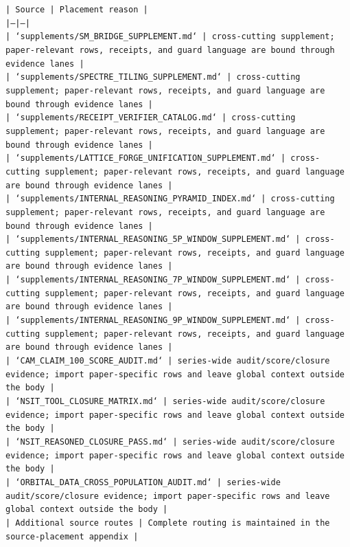\documentclass[11pt]{article}
\begin{document}
\noindent\texttt{| Source | Placement reason |}\\
\noindent\texttt{|---|---|}\\
\noindent\texttt{| `supplements/SM\_BRIDGE\_SUPPLEMENT.md` | cross-cutting supplement; paper-relevant rows, receipts, and guard language are bound through evidence lanes |}\\
\noindent\texttt{| `supplements/SPECTRE\_TILING\_SUPPLEMENT.md` | cross-cutting supplement; paper-relevant rows, receipts, and guard language are bound through evidence lanes |}\\
\noindent\texttt{| `supplements/RECEIPT\_VERIFIER\_CATALOG.md` | cross-cutting supplement; paper-relevant rows, receipts, and guard language are bound through evidence lanes |}\\
\noindent\texttt{| `supplements/LATTICE\_FORGE\_UNIFICATION\_SUPPLEMENT.md` | cross-cutting supplement; paper-relevant rows, receipts, and guard language are bound through evidence lanes |}\\
\noindent\texttt{| `supplements/INTERNAL\_REASONING\_PYRAMID\_INDEX.md` | cross-cutting supplement; paper-relevant rows, receipts, and guard language are bound through evidence lanes |}\\
\noindent\texttt{| `supplements/INTERNAL\_REASONING\_5P\_WINDOW\_SUPPLEMENT.md` | cross-cutting supplement; paper-relevant rows, receipts, and guard language are bound through evidence lanes |}\\
\noindent\texttt{| `supplements/INTERNAL\_REASONING\_7P\_WINDOW\_SUPPLEMENT.md` | cross-cutting supplement; paper-relevant rows, receipts, and guard language are bound through evidence lanes |}\\
\noindent\texttt{| `supplements/INTERNAL\_REASONING\_9P\_WINDOW\_SUPPLEMENT.md` | cross-cutting supplement; paper-relevant rows, receipts, and guard language are bound through evidence lanes |}\\
\noindent\texttt{| `CAM\_CLAIM\_100\_SCORE\_AUDIT.md` | series-wide audit/score/closure evidence; import paper-specific rows and leave global context outside the body |}\\
\noindent\texttt{| `NSIT\_TOOL\_CLOSURE\_MATRIX.md` | series-wide audit/score/closure evidence; import paper-specific rows and leave global context outside the body |}\\
\noindent\texttt{| `NSIT\_REASONED\_CLOSURE\_PASS.md` | series-wide audit/score/closure evidence; import paper-specific rows and leave global context outside the body |}\\
\noindent\texttt{| `ORBITAL\_DATA\_CROSS\_POPULATION\_AUDIT.md` | series-wide audit/score/closure evidence; import paper-specific rows and leave global context outside the body |}\\
\noindent\texttt{| Additional source routes | Complete routing is maintained in the source-placement appendix |}\\
\end{document}
